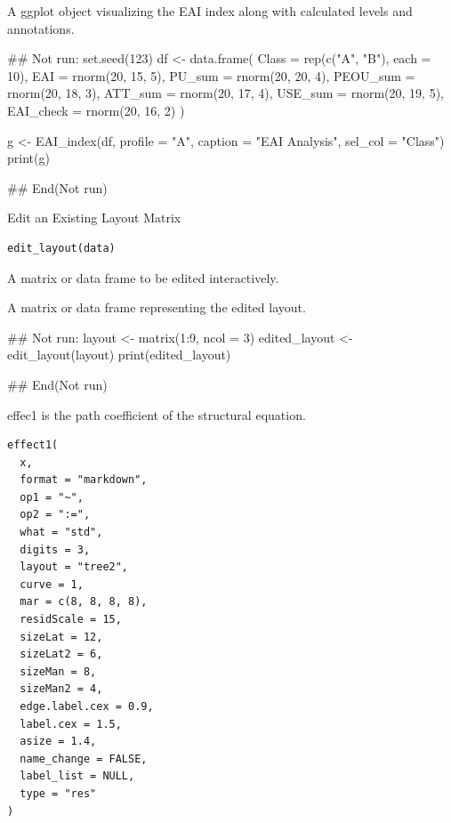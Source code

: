 \documentclass[a4paper]{book}
\begin{document}
%
\begin{Value}
A ggplot object visualizing the EAI index along with calculated levels and annotations.
\end{Value}
%
\begin{Examples}
\begin{ExampleCode}
\#\# Not run: 
set.seed(123)
df <- data.frame(
  Class = rep(c("A", "B"), each = 10),
  EAI = rnorm(20, 15, 5),
  PU_sum = rnorm(20, 20, 4),
  PEOU_sum = rnorm(20, 18, 3),
  ATT_sum = rnorm(20, 17, 4),
  USE_sum = rnorm(20, 19, 5),
  EAI_check = rnorm(20, 16, 2)
)

g <- EAI_index(df, profile = "A", caption = "EAI Analysis", sel_col = "Class")
print(g)

## End(Not run)
\end{ExampleCode}
\end{Examples}
%
\begin{Description}
Edit an Existing Layout Matrix
\end{Description}
%
\begin{Usage}
\begin{verbatim}
edit_layout(data)
\end{verbatim}
\end{Usage}
%
\begin{Arguments}
\begin{ldescription}
\item[\code{data}] A matrix or data frame to be edited interactively.
\end{ldescription}
\end{Arguments}
%
\begin{Value}
A matrix or data frame representing the edited layout.
\end{Value}
%
\begin{Examples}
\begin{ExampleCode}
\#\# Not run: 
layout <- matrix(1:9, ncol = 3)
edited_layout <- edit_layout(layout)
print(edited_layout)

## End(Not run)
\end{ExampleCode}
\end{Examples}
%
\begin{Description}
effec1 is the path coefficient of the structural equation.
\end{Description}
%
\begin{Usage}
\begin{verbatim}
effect1(
  x,
  format = "markdown",
  op1 = "~",
  op2 = ":=",
  what = "std",
  digits = 3,
  layout = "tree2",
  curve = 1,
  mar = c(8, 8, 8, 8),
  residScale = 15,
  sizeLat = 12,
  sizeLat2 = 6,
  sizeMan = 8,
  sizeMan2 = 4,
  edge.label.cex = 0.9,
  label.cex = 1.5,
  asize = 1.4,
  name_change = FALSE,
  label_list = NULL,
  type = "res"
)
\end{verbatim}
\end{Usage}
\end{document}
